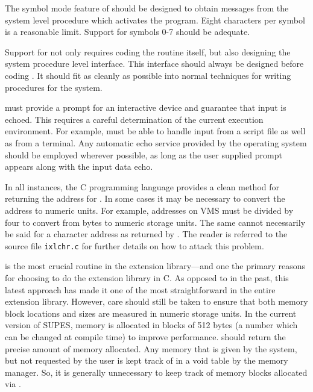 The symbol mode feature of  should be designed to obtain messages from
the system level procedure which activates the program.  Eight characters
per symbol is a reasonable limit.  Support for symbols 0-7 should be
adequate.

Support for  not only requires coding the routine itself, but also
designing the system procedure level interface.  This interface should
always be designed before coding .  It should fit as cleanly as
possible into normal techniques for writing procedures for the system.

 must provide a prompt for an interactive device and
guarantee that input is echoed.  This requires a careful determination of
the current execution environment.  For example,  must be able to
handle input from a script file as well as from a terminal.  Any automatic
echo service provided by the operating system should be employed wherever
possible, as long as the user supplied prompt appears along with the input
data echo.

In all instances,
the C programming language provides a clean method for returning the
address for \@. In some cases it may be necessary to
convert the address to numeric units.  For example, addresses on VMS must be
divided by four to convert from bytes to numeric storage units.
The same cannot necessarily be said for a character address
as returned by \@.
The reader is referred to the source file \verb+ixlchr.c+ for further details
on how to attack this problem.

 is the most crucial routine in the extension
library---and one the primary reasons for choosing to do the extension
library in C.
As opposed to in the past,
this latest approach has made it one of the most straightforward in
the entire extension library.
However, care should still be
taken to ensure that both memory block locations and sizes are measured in
numeric storage units.
In the current version of SUPES,
memory is allocated in blocks of 512 bytes
(a number which can be changed at compile time)
to improve performance.
 should return the precise amount of
memory allocated.
Any memory that is given by the system,
but not requested by the user is kept track of in a void table
by the memory manager.
So, it is generally unnecessary to keep track of memory
blocks allocated via .

